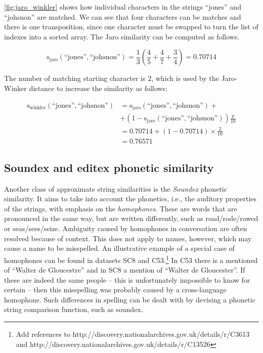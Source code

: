 \cref{fig:jaro_winkler} shows how individual characters in the strings ``jones'' and ``johsnon'' are matched.
We can see that four characters can be matches and there is one transposition, since one character must be swapped to turn the list of indexes into a sorted array.
The Jaro similarity can be computed as follows.

\begin{equation*}
    \mathrm{s_{jaro}}(\text{``jones''}, \text{``johsnon''}) = \frac{1}{3} \left(\frac{4}{5} + \frac{4}{7} + \frac{3}{4} \right) = 0.70714
\end{equation*}

\noindent The number of matching starting character is $2$, which is used by the Jaro-Winker distance to increase the similarity as follows:

\begin{align*}
    \mathrm{s_{winkler}}(\text{``jones''}, \text{``johsnon''}) &= \mathrm{s_{jaro}}(\text{``jones''}, \text{``johsnon''}) + \\
    &+(1-\mathrm{s_{jaro}}(\text{``jones''}, \text{``johsnon''}))\frac{p}{10} \\
    &= 0.70714 + (1 - 0.70714)\times\frac{2}{10} \\
    &= 0.76571
\end{align*}




\subsection{Soundex and editex phonetic similarity}
\label{subsec:soundex}

Another class of approximate string similarities is the \emph{Soundex} phonetic similarity.
It aims to take into account the phonetics, i.e., the auditory properties of the strings, with emphasis on the \emph{homophones}.
These are words that are pronounced in the same way, but are written differently, such as road/rode/rowed or seas/sees/seize.
Ambiguity caused by homophones in conversation are often resolved because of context.
This does not apply to names, however, which may cause a name to be misspelled.
An illustrative example of a special case of homophones can be found in datasets SC8 and C53.\footnote{Add references to http://discovery.nationalarchives.gov.uk/details/r/C3613 and http://discovery.nationalarchives.gov.uk/details/r/C13526}
In C53 there is a mentioned of ``Walter de Gloucestre'' and in SC8 a mention of ``Walter de Gloucester''.
If these are indeed the same people -- this is unfortunately impossible to know for certain -- then this misspelling was probably caused by a cross-language homophone.
Such differences in spelling can be dealt with by devising a phonetic string comparison function, such as soundex.

